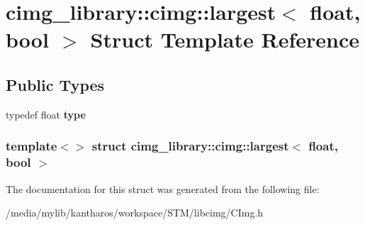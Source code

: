\hypertarget{structcimg__library_1_1cimg_1_1largest_3_01float_00_01bool_01_4}{
\section{cimg\_\-library::cimg::largest$<$ float, bool $>$ Struct Template Reference}
\label{structcimg__library_1_1cimg_1_1largest_3_01float_00_01bool_01_4}
}
\subsection*{Public Types}
\begin{DoxyCompactItemize}
\item 
\hypertarget{structcimg__library_1_1cimg_1_1largest_3_01float_00_01bool_01_4_a05f7a91d39b5614d0a7e4942808f3eb7}{
typedef float {\bfseries type}}
\label{structcimg__library_1_1cimg_1_1largest_3_01float_00_01bool_01_4_a05f7a91d39b5614d0a7e4942808f3eb7}

\end{DoxyCompactItemize}
\subsubsection*{template$<$$>$ struct cimg\_\-library::cimg::largest$<$ float, bool $>$}



The documentation for this struct was generated from the following file:\begin{DoxyCompactItemize}
\item 
/media/mylib/kantharos/workspace/STM/libcimg/CImg.h\end{DoxyCompactItemize}
